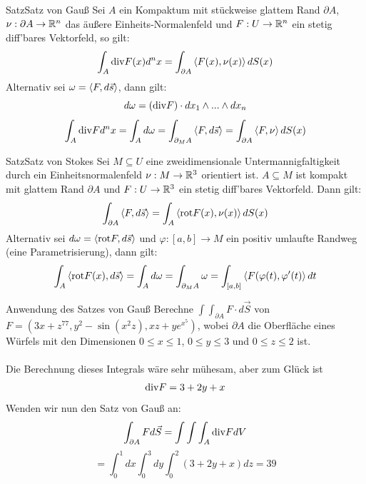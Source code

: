 \begin{Satz}{Satz}{Satz von Gauß}
    Sei $A$ ein Kompaktum mit stückweise glattem Rand $\partial A$, $\nu: \partial A\rightarrow \mathbb{R}^n$ das äußere Einheits-Normalenfeld und $F:U\rightarrow \mathbb{R}^n$ ein stetig diff'bares Vektorfeld, so gilt:
    $$\int_A \text{div} F(x)d^nx=\int_{\partial A}\braket{F(x), \nu(x)}dS(x)$$
    Alternativ sei $\omega=\braket{F, d\vec{s}}$, dann gilt:
    $$d\omega=(\text{div} F)\cdot dx_1\land ...\land dx_n$$
    $$\int_A \text{div} F d^nx=\int_A d\omega=\int_{\partial_M A}\braket{F, d\vec{s}}=\int_{\partial A}\braket{F,\nu}dS(x)$$
\end{Satz}
\begin{Satz}{Satz}{Satz von Stokes}
    Sei $M\subseteq U$ eine zweidimensionale Untermannigfaltigkeit durch ein Einheitsnormalenfeld $\nu: M\rightarrow \mathbb{R}^3$ orientiert ist. $A\subseteq M$ ist kompakt mit glattem Rand $\partial A$ und $F:U\rightarrow \mathbb{R}^3$ ein stetig diff'bares Vektorfeld. Dann gilt:
    $$\int_{\partial A}\braket{F, d\vec{s}}=\int_A\braket{\text{rot} F(x), \nu(x)}dS(x)$$
    Alternativ sei $d\omega=\braket{\text{rot} F, d\vec{s}}$ und $\varphi: [a,b]\rightarrow M$ ein positiv umlaufte Randweg (eine Parametrisierung), dann gilt:
    $$\int_A\braket{\text{rot} F(x), d\vec{s}}=\int_A d\omega =\int_{\partial_M A} \omega =\int_{[a,b]}\braket{F(\varphi(t), \varphi'(t)}dt$$
\end{Satz}
\begin{Beispiel}{Anwendung des Satzes von Gauß}
    Berechne $\int\int_{\partial A} F\cdot d\vec{S}$ von $F=(3x+z^{77}, y^2-\sin(x^2z), xz+ye^{x^5})$, wobei $\partial A$ die Oberfläche eines Würfels mit den Dimensionen $0\leq x \leq 1$, $0\leq y\leq 3$ und $0\leq z\leq 2$ ist. \\ \\
    Die Berechnung dieses Integrals wäre sehr mühesam, aber zum Glück ist $$\text{div} F = 3+2y+x$$ Wenden wir nun den Satz von Gauß an:
    $$\int_{\partial A}  F d\vec{S} =\int\int\int_A \text{div} F dV$$
    $$=\int_0^1 dx \int_0^3 dy \int_0^2(3+2y+x)dz=39$$
\end{Beispiel}
